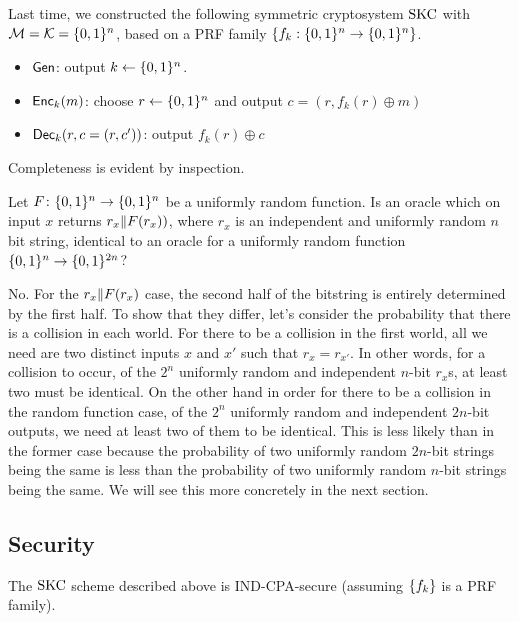 \documentclass[11pt]{article}
\begin{document}
Last time, we constructed the following symmetric cryptosystem $\text{SKC}$
with $\mathcal{M} = \mathcal{K} = \{0,1\}^{n}$, based on a PRF family
$\{f_{k} : \{0,1\}^{n} \to \{0,1\}^{n}\}$.

\begin{itemize}
\item $\mathsf{Gen}$: output $k \gets \{0,1\}^{n}$.
\item $\mathsf{Enc}_{k}(m)$: choose $r \gets \{0,1\}^{n}$ and output $c = (r,
  f_{k}(r) \oplus m)$
\item $\mathsf{Dec}_{k}(r, c = (r,c'))$: output $f_{k}(r) \oplus c$
\end{itemize}
Completeness is evident by inspection.

\begin{question}
    Let \(F \colon \{0,1\}^n \to \{0,1\}^n\) be a uniformly random function. Is an oracle which
    on input \(x\) returns \(r_x \| F(r_x))\), where \(r_x\) is an independent and
    uniformly random $n$ bit string, identical to an oracle for a uniformly random
    function \(\{0,1\}^n \to \{0,1\}^{2n}\)?
\end{question}
\begin{answer}
    No. For the \(r_x \| F(r_x)\) case, the second half of the bitstring is
    entirely determined by the first half. To show that they differ, let's consider the
    probability that there is a collision in each world. For there to be a collision in
    the first world, all we need are two distinct inputs \(x\) and \(x'\) such that \(r_x
    = r_{x'}\). In other words, for a collision to occur, of the \(2^n\) uniformly random
    and independent \(n\)-bit
    \(r_x\)s, at least two must be identical. On the other hand in order for there to be a
    collision in the random function case, of the \(2^n\) uniformly random and independent
    \(2n\)-bit outputs, we need at least two of them to be identical. This is less likely
    than in the former case because the probability of two uniformly random \(2n\)-bit
    strings being the same is less than the probability of two uniformly random \(n\)-bit
    strings being the same. We will see this more concretely in the next section.
\end{answer}

\subsection{Security}
\label{sec:security}

\begin{theorem}
  The $\text{SKC}$ scheme described above is IND-CPA-secure (assuming
  $\{f_{k}\}$ is a PRF family).
\end{theorem}
\end{document}
